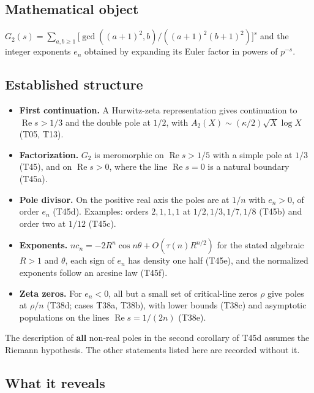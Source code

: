 \documentclass[
  11pt,
]{article}
\providecommand{\tightlist}{%
  \setlength{\itemsep}{0pt}\setlength{\parskip}{0pt}}
\begin{document}
\hypertarget{mathematical-object-6}{%
\subsection{Mathematical object}\label{mathematical-object-6}}

\(G_2(s)=\sum_{a,b\ge1}\big[\gcd((a+1)^2,b)/((a+1)^2(b+1)^2)\big]^s\)
and the integer exponents \(e_n\) obtained by expanding its Euler factor
in powers of \(p^{-s}\).

\hypertarget{established-structure-6}{%
\subsection{Established structure}\label{established-structure-6}}

\begin{itemize}
\tightlist
\item
  \textbf{First continuation.} A Hurwitz-zeta representation gives
  continuation to \(\operatorname{Re}s>1/3\) and the double pole at
  \(1/2\), with \(A_2(X)\sim(\kappa/2)\sqrt X\log X\) (T05, T13).
\item
  \textbf{Factorization.} \(G_2\) is meromorphic on
  \(\operatorname{Re}s>1/5\) with a simple pole at \(1/3\) (T45), and on
  \(\operatorname{Re}s>0\), where the line \(\operatorname{Re}s=0\) is a
  natural boundary (T45a).
\item
  \textbf{Pole divisor.} On the positive real axis the poles are at
  \(1/n\) with \(e_n>0\), of order \(e_n\) (T45d). Examples: orders
  \(2,1,1,1\) at \(1/2,1/3,1/7,1/8\) (T45b) and order two at \(1/12\)
  (T45c).
\item
  \textbf{Exponents.} \(nc_n=-2R^n\cos n\theta+O(\tau(n)R^{n/2})\) for
  the stated algebraic \(R>1\) and \(\theta\), each sign of \(e_n\) has
  density one half (T45e), and the normalized exponents follow an
  arcsine law (T45f).
\item
  \textbf{Zeta zeros.} For \(e_n<0\), all but a small set of
  critical-line zeros \(\rho\) give poles at \(\rho/n\) (T38d; cases
  T38a, T38b), with lower bounds (T38c) and asymptotic populations on
  the lines \(\operatorname{Re}s=1/(2n)\) (T38e).
\end{itemize}

The description of \textbf{all} non-real poles in the second corollary
of T45d assumes the Riemann hypothesis. The other statements listed here
are recorded without it.

\hypertarget{what-it-reveals-6}{%
\subsection{What it reveals}\label{what-it-reveals-6}}
\end{document}
